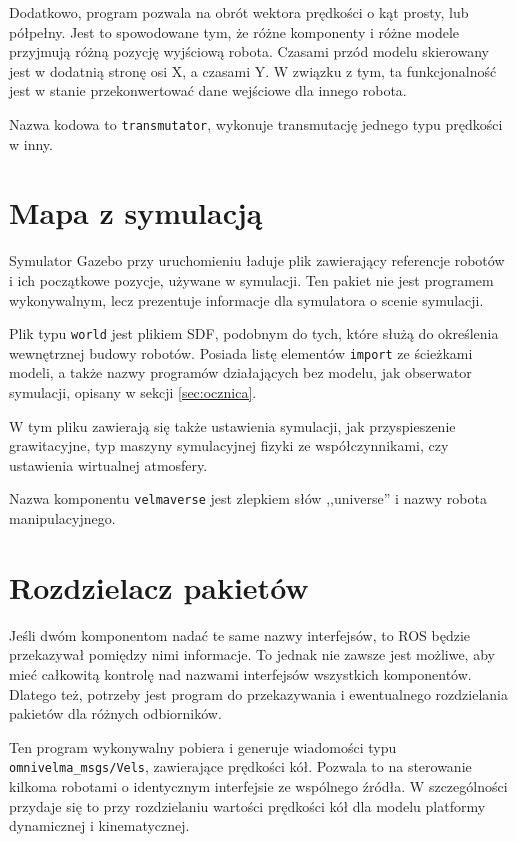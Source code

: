 	Dodatkowo, program pozwala na obrót wektora prędkości o kąt prosty, lub półpełny. 
	Jest to spowodowane tym, że różne komponenty i różne modele przyjmują różną pozycję wyjściową robota.
	Czasami przód modelu skierowany jest w dodatnią stronę osi X, a czasami Y. W związku z tym, ta funkcjonalność jest w stanie przekonwertować dane wejściowe dla innego robota.
	
	Nazwa kodowa to \texttt{transmutator}, wykonuje transmutację jednego typu prędkości w inny.
	
\section{Mapa z symulacją}
	Symulator Gazebo przy uruchomieniu ładuje plik zawierający referencje robotów i ich początkowe pozycje, używane w symulacji.
	Ten pakiet nie jest programem wykonywalnym, lecz prezentuje informacje dla symulatora o scenie symulacji.
	
	Plik typu \texttt{world} jest plikiem SDF, podobnym do tych, które służą do określenia wewnętrznej budowy robotów.
	Posiada listę elementów \texttt{import} ze ścieżkami modeli, a także nazwy programów działających bez modelu, jak obserwator symulacji, opisany w sekcji \ref{sec:ocznica}.

	W tym pliku zawierają się także ustawienia symulacji, jak przyspieszenie grawitacyjne, typ maszyny symulacyjnej fizyki ze współczynnikami, czy ustawienia wirtualnej atmosfery.
	
	Nazwa komponentu \texttt{velmaverse} jest zlepkiem słów ,,universe'' i nazwy robota manipulacyjnego.
	
\section{Rozdzielacz pakietów}
	Jeśli dwóm komponentom nadać te same nazwy interfejsów, to ROS będzie przekazywał pomiędzy nimi informacje.
	To jednak nie zawsze jest możliwe, aby mieć całkowitą kontrolę nad nazwami interfejsów wszystkich komponentów.
	Dlatego też, potrzeby jest program do przekazywania i ewentualnego rozdzielania pakietów dla różnych odbiorników.
	
	Ten program wykonywalny pobiera i generuje wiadomości typu \texttt{omnivelma\_msgs/Vels}, zawierające prędkości kół.
	Pozwala to na sterowanie kilkoma robotami o identycznym interfejsie ze wspólnego źródła.
	W szczególności przydaje się to przy rozdzielaniu wartości prędkości kół dla modelu platformy dynamicznej i kinematycznej.
	
